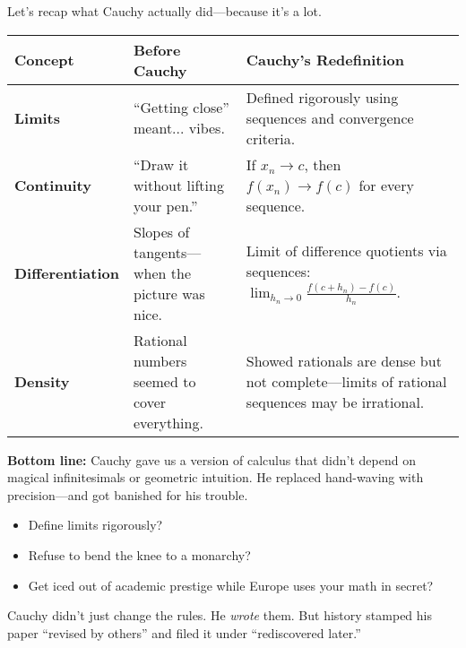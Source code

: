 Let’s recap what Cauchy actually did—because it’s a lot.

\begin{center}
\renewcommand{\arraystretch}{1.4}
\begin{tabular}{|p{3.5cm}|p{5cm}|p{5cm}|}
\hline
\textbf{Concept} & \textbf{Before Cauchy} & \textbf{Cauchy’s Redefinition} \\
\hline
\textbf{Limits} & “Getting close” meant... vibes. & Defined rigorously using sequences and convergence criteria. \\
\hline
\textbf{Continuity} & “Draw it without lifting your pen.” & If $x_n \to c$, then $f(x_n) \to f(c)$ for every sequence. \\
\hline
\textbf{Differentiation} & Slopes of tangents—when the picture was nice. & Limit of difference quotients via sequences: $\displaystyle \lim_{h_n \to 0} \frac{f(c + h_n) - f(c)}{h_n}$. \\
\hline
\textbf{Density} & Rational numbers seemed to cover everything. & Showed rationals are dense but not complete—limits of rational sequences may be irrational. \\
\hline
\end{tabular}
\end{center}

\bigskip

\textbf{Bottom line:}  
Cauchy gave us a version of calculus that didn’t depend on magical infinitesimals or geometric intuition. He replaced hand-waving with precision—and got banished for his trouble.

\begin{itemize}
  \item Define limits rigorously? \checkmark
  \item Refuse to bend the knee to a monarchy? \checkmark
  \item Get iced out of academic prestige while Europe uses your math in secret? \checkmark\checkmark
\end{itemize}

Cauchy didn’t just change the rules. He \textit{wrote} them. But history stamped his paper “revised by others” and filed it under “rediscovered later.”


